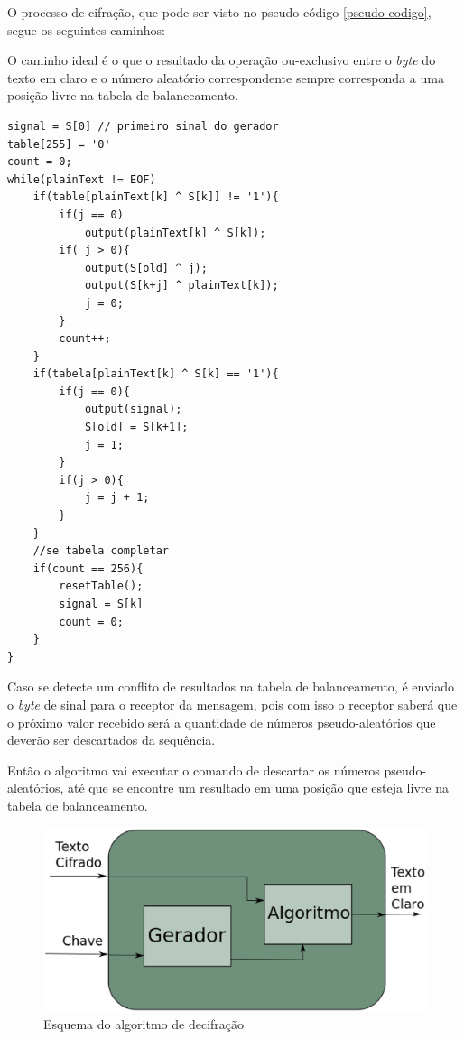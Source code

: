 O processo de cifração, que pode ser visto no pseudo-código \ref{pseudo-codigo}, segue os seguintes caminhos:


O caminho ideal é o que o resultado da operação ou-exclusivo entre o \textit{byte} do texto em claro e o número aleatório correspondente sempre corresponda a uma posição livre na tabela de balanceamento.

\begin{lstlisting}[caption={Pseudo-Código Cifração}, label=pseudo-codigo]
signal = S[0] // primeiro sinal do gerador
table[255] = '0'
count = 0;
while(plainText != EOF)
	if(table[plainText[k] ^ S[k]] != '1'){
		if(j == 0)
			output(plainText[k] ^ S[k]);
		if( j > 0){
			output(S[old] ^ j);
			output(S[k+j] ^ plainText[k]);
			j = 0;
		}
		count++;
	}
	if(tabela[plainText[k] ^ S[k] == '1'){
		if(j == 0){
			output(signal);
			S[old] = S[k+1];
			j = 1;		
		}
		if(j > 0){
			j = j + 1;
		}
	}
	//se tabela completar
	if(count == 256){
		resetTable();
		signal = S[k]
		count = 0;
	}
}
    \end{lstlisting}


Caso se detecte um conflito de resultados na tabela de balanceamento, é enviado o \textit{byte} de sinal para o receptor da mensagem, pois com isso o receptor saberá que o próximo valor recebido será a quantidade de números pseudo-aleatórios que deverão ser descartados da sequência. 

Então o algoritmo vai executar o comando de descartar os números pseudo-aleatórios, até que se encontre um resultado em uma posição que esteja livre na tabela de balanceamento. 


\begin{figure}[h]
	\centering
	\includegraphics[scale=0.4]{figuras/metodo_de_decifra.eps}
	\caption{Esquema do algoritmo de decifração}
\end{figure}

